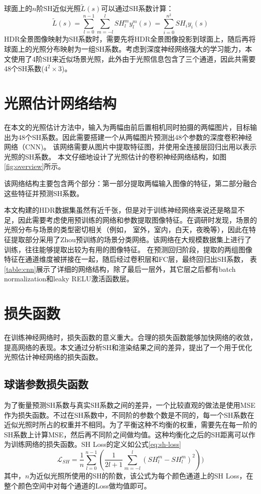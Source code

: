 球面上的$n$阶SH近似光照$\tilde{L}(s)$可以通过SH系数计算：
\begin{equation}
    \tilde{L}(s)=\sum_{l=0}^{n-1}\sum_{m=-l}^{l}SH^m_ly^m_l(s)=\sum_{i=0}^{n^2}SH_iy_i(s)
\end{equation}
HDR全景图像映射为SH系数时，需要先将HDR全景图像投影到球面上，随后再将球面上的光照分布映射为一组SH系数。考虑到深度神经网络强大的学习能力，本文使用了4阶SH来近似场景光照，此外由于光照信息包含了三个通道，因此共需要48个SH系数($4^2\times3$)。
\section{光照估计网络结构}
在本文的光照估计方法中，输入为两幅由前后置相机同时拍摄的两幅图片，目标输出为48个SH系数。因此需要搭建一个从两幅图片预测出48个参数的深度卷积神经网络（CNN)。
该网络需要从图片中提取特征图，并使用全连接层回归出用以表示光照的SH系数。
本文仔细地设计了光照估计的卷积神经网络结构，如图\ref{fig:overview}所示。



该网络结构主要包含两个部分：第一部分提取两幅输入图像的特征，第二部分融合这些特征并预测SH系数。 

本文构建的HDR数据集虽然有近千张，但是对于训练神经网络来说还是略显不足，因此需要考虑使用预训练的网络和参数提取图像特征。在调研时发现，场景的光照分布与场景的类型密切相关（例如， 室外，室内，白天，夜晚等），因此在特征提取部分采用了Zhou预训练的场景分类网络\cite{zhou2017places}。该网络在大规模数据集上进行了训练，往往能够提取出较为有用的图像特征。 在预测回归阶段，提取的两组图像特征在通道维度被拼接在一起，随后经过卷积层和FC层，最终回归出SH系数， 表\ref{table:cnn}展示了详细的网络结构，除了最后一层外，其它层之后都有batch normalization和leaky RELU激活函数层。


\section{损失函数}\label{sec:loss-function}
在训练神经网络时，损失函数的意义重大。合理的损失函数能够加快网络的收敛，提高网络的表现。本文通过分析SH和渲染结果之间的差异，提出了一个用于优化光照估计神经网络的损失函数。
\subsection{球谐参数损失函数} 为了衡量预测SH系数与真实SH系数之间的差异，一个比较直观的做法是使用MSE作为损失函数。不过在SH系数中，不同阶的参数个数是不同的，每一个SH系数在近似光照时所占的权重并不相同。为了平衡这种不均衡的权重，需要先在每一阶的SH系数上计算MSE，然后再不同阶之间做均值。这种均衡化之后的SH距离可以作为训练网络的损失函数。SH Loss的定义如公式\ref{eq:sh-loss}
\begin{equation}
    \mathcal{L}_{SH} = \frac{1}{n}\sum_{l=0}^{n-1}(\frac{1}{2l+1}\sum_{m=-l}^{l}(SH^m_l - SH^m_l)^2))
    \label{eq:sh-loss}
\end{equation}
其中，$n$为近似光照所使用的SH的阶数，该公式为每个颜色通道上的SH Loss，在整个颜色空间中对每个通道的Loss做均值即可。

